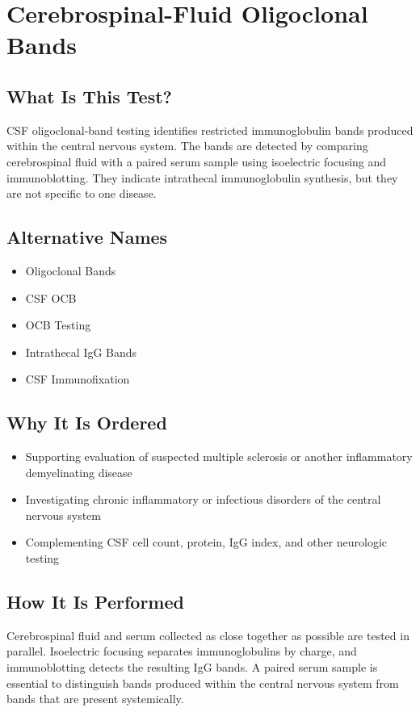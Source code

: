 \chapter{Cerebrospinal-Fluid Oligoclonal Bands}

\section*{What Is This Test?}
CSF oligoclonal-band testing identifies restricted immunoglobulin bands produced within the central nervous system. The bands are detected by comparing cerebrospinal fluid with a paired serum sample using isoelectric focusing and immunoblotting. They indicate intrathecal immunoglobulin synthesis, but they are not specific to one disease.

\section*{Alternative Names}
\begin{itemize}
  \item Oligoclonal Bands
  \item CSF OCB
  \item OCB Testing
  \item Intrathecal IgG Bands
  \item CSF Immunofixation
\end{itemize}
\section*{Why It Is Ordered}
\begin{itemize}
  \item Supporting evaluation of suspected multiple sclerosis or another inflammatory demyelinating disease
  \item Investigating chronic inflammatory or infectious disorders of the central nervous system
  \item Complementing CSF cell count, protein, IgG index, and other neurologic testing
\end{itemize}

\section*{How It Is Performed}
Cerebrospinal fluid and serum collected as close together as possible are tested in parallel. Isoelectric focusing separates immunoglobulins by charge, and immunoblotting detects the resulting IgG bands. A paired serum sample is essential to distinguish bands produced within the central nervous system from bands that are present systemically.

